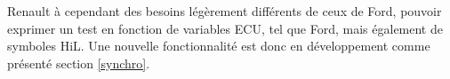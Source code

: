 	Renault à cependant des besoins légèrement différents de ceux de Ford, pouvoir exprimer un test en fonction de variables ECU, tel que Ford, mais également de symboles HiL. Une nouvelle fonctionnalité est donc en développement comme présenté section \ref{synchro}.

%
%
%	
